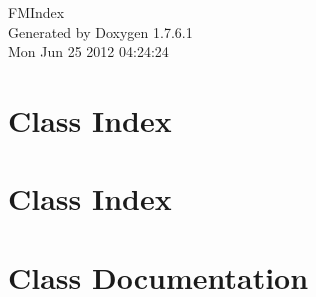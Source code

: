 \documentclass[a4paper]{book}
\begin{document}
\hypersetup{pageanchor=false,citecolor=blue}
\begin{titlepage}
\vspace*{7cm}
\begin{center}
{\Large \-F\-M\-Index }\\
\vspace*{1cm}
{\large \-Generated by Doxygen 1.7.6.1}\\
\vspace*{0.5cm}
{\small Mon Jun 25 2012 04:24:24}\\
\end{center}
\end{titlepage}
\clearemptydoublepage
{}
\tableofcontents
\clearemptydoublepage
{}
\hypersetup{pageanchor=true,citecolor=blue}
\chapter{\-Class \-Index}

\chapter{\-Class \-Index}

\chapter{\-Class \-Documentation}




















\printindex
\end{document}
